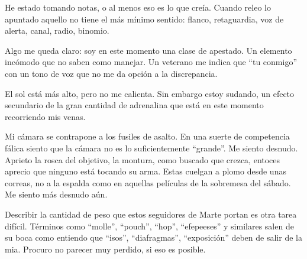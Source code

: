 \documentclass[10pt,a4paper,twoside,twocolumn,final]{article}
\begin{document}
	He estado tomando notas, o al menos eso es lo que cre\'ia. Cuando releo lo apuntado aquello no tiene el m\'as m\'inimo sentido: flanco, retaguardia, voz de alerta, canal, radio, binomio.
	
	Algo me queda claro: soy en este momento una clase de apestado. Un elemento inc\'omodo que no saben como manejar. Un veterano me indica que ``tu conmigo'' con un tono de voz que no me da opci\'on a la discrepancia.
	
	El sol est\'a m\'as alto, pero no me calienta. Sin embargo estoy sudando, un efecto secundario de la gran cantidad de adrenalina que est\'a en este momento recorriendo mis venas.
	
	Mi c\'amara se contrapone a los fusiles de asalto. En una suerte de competencia f\'alica siento que la c\'amara no es lo suficientemente ``grande''. Me siento desnudo. Aprieto la rosca del objetivo, la montura, como buscado que crezca, entoces aprecio que ninguno est\'a tocando su arma. Estas cuelgan a plomo desde unas correas, no a la espalda como en aquellas pel\'iculas de la sobremesa del s\'abado. Me siento m\'as desnudo a\'un.
	
	Describir la cantidad de peso que estos seguidores de Marte portan es otra tarea dif\'icil. T\'erminos como ``molle'', ``pouch'', ``hop'', ``efepeeses'' y similares salen de su boca como entiendo que ``isos'', ``diafragmas'', ``exposici\'on'' deben de salir de la mia. Procuro no parecer muy perdido, si eso es posible.
	
	
	
\end{document}
